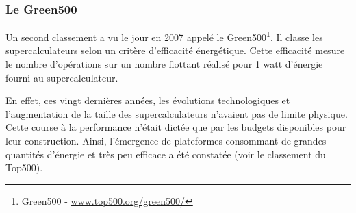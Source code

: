         \begin{table}[]
\centering
{}
\caption{Classement du Top500 de novembre 2019. Les puissances Rpeak (puissance théorique) et Rmax (puissance mesurée par HPL) sont données en pétaFLOPS ($10^{15}$ FLOPS). L'efficacité est le rapport entre Rmax et Rpeak.}
\label{tab:top500}
\end{table}
   
    \subsubsection{Le Green500}
        
        Un second classement a vu le jour en 2007 appelé le Green500\footnote{Green500 - \url{www.top500.org/green500/}}. Il classe les supercalculateurs selon un critère d'efficacité énergétique. Cette efficacité mesure le nombre d'opérations sur un nombre flottant réalisé pour 1 watt d'énergie fourni au supercalculateur. 
    
        En effet, ces vingt dernières années, les évolutions technologiques et l'augmentation de la taille des supercalculateurs n'avaient pas de limite physique. Cette course à la performance n'était dictée que par les budgets disponibles pour leur construction. Ainsi, l'émergence de plateformes consommant de grandes quantités d'énergie et très peu efficace a été constatée (voir le classement du Top500). 
        
